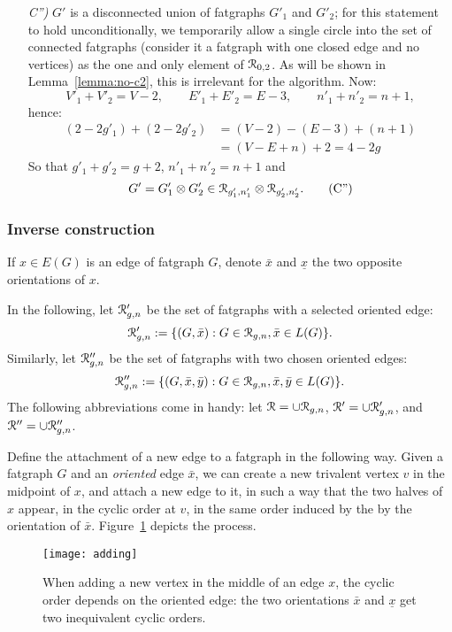 \begin{enumerate}
\item[\slshape C'')] $G'$ is a disconnected union of fatgraphs $G'_1$ and
  $G'_2$; for this statement to hold unconditionally, we temporarily allow a
  single circle into the set of connected fatgraphs (consider it a fatgraph
  with one closed edge and no vertices) as the one and only element of
  $\mathcal{R}_{0,2}$.  As will be shown in Lemma~\ref{lemma:no-c2}, this is
  irrelevant for the algorithm.  Now:
  \begin{equation*} V'_1 + V'_2 = V -2, 
    \qquad E'_1 + E'_2 = E - 3,
    \qquad n'_1 + n'_2 = n + 1,
  \end{equation*} hence:
\begin{align*} 
  (2- 2g'_1) + (2-2g'_2) &= (V-2) - (E-3) + (n+1) 
  \\ 
  &= (V-E+n) + 2 = 4 - 2g
\end{align*} 
So that $g'_1 + g'_2 = g + 2$, $n'_1 + n'_2 = n+1$ and
\begin{equation} 
  G'= G'_1 \otimes G'_2 \in \mathcal{R}_{g'_1, n'_1} \otimes \mathcal{R}_{g'_2, n'_2}.
  \label{eq:C''}\tag{C''}
\end{equation}
\end{enumerate}

\subsubsection{Inverse construction}
\label{sec:addition}

If $x \in E(G)$ is an edge of fatgraph $G$, denote $\bar{x}$ and
$\underline{x}$ the two opposite orientations of $x$.

In the following, let $\mathcal{R}'_{g,n}$ be the set of fatgraphs with a
selected oriented edge:
\begin{equation*}
  \mathcal{R}'_{g,n} := \{ (G,\bar x) : G \in \mathcal{R}_{g,n}, \bar{x} \in L(G)\}.
\end{equation*}
Similarly, let $\mathcal{R}''_{g,n}$ be the set of fatgraphs with two
chosen oriented edges:
\begin{equation*}
  \mathcal{R}''_{g,n} := \{ (G, \bar x, \bar y) : G \in \mathcal{R}_{g,n}, 
                   \bar{x}, \bar{y} \in L(G) \}.
\end{equation*}
The following abbreviations come in handy: let $\mathcal{R} = \cup \mathcal{R}_{g,n}$,
$\mathcal{R}' = \cup \mathcal{R}'_{g,n}$, and $\mathcal{R}'' = \cup \mathcal{R}''_{g,n}$.

Define the attachment of a new edge to a fatgraph in the following
way.  Given a fatgraph $G$ and an \emph{oriented} edge $\bar{x}$, we
can create a new trivalent vertex $v$ in the midpoint of $x$, and
attach a new edge to it, in such a way that the two halves of $x$
appear, in the cyclic order at $v$, in the same order induced by the
by the orientation of $\bar{x}$.  Figure~\ref{fig:adding} depicts the process.
\begin{figure}
  \centering
  \texttt{[image: adding]}
  \caption{When adding a new vertex in the middle of an edge $x$, the cyclic order depends on the oriented edge: the two orientations $\bar{x}$ and $\underline{x}$ get two inequivalent cyclic orders.}
  \label{fig:adding}
\end{figure}

